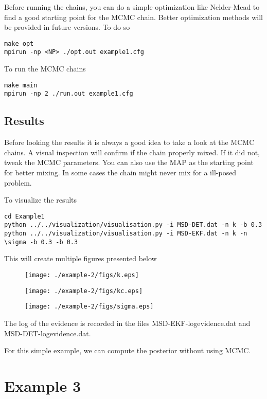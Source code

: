 \documentclass{article}
\begin{document}
Before running the chains, you can do a simple optimization like Nelder-Mead to find a good starting point for the MCMC chain. Better optimization methods will be provided in future versions. To do so
\begin{lstlisting}
make opt
mpirun -np <NP> ./opt.out example1.cfg
\end{lstlisting}

To run the MCMC chains
\begin{lstlisting}
make main
mpirun -np 2 ./run.out example1.cfg
\end{lstlisting}



\subsection{Results}

Before looking the results it is always a good idea to take a look at the MCMC chains. A visual inspection will confirm if the chain properly mixed. If it did not, tweak the MCMC parameters. You can also use the MAP as the starting point for better mixing. In some cases the chain might never mix for a ill-posed problem.

To visualize the results 
\begin{lstlisting}
cd Example1
python ../../visualization/visualisation.py -i MSD-DET.dat -n k -b 0.3
python ../../visualization/visualisation.py -i MSD-EKF.dat -n k -n \sigma -b 0.3 -b 0.3
\end{lstlisting}
This will create multiple figures presented below

\begin{figure}
\texttt{[image: ./example-2/figs/k.eps]}
\end{figure}

\begin{figure}
\texttt{[image: ./example-2/figs/kc.eps]}
\end{figure}

\begin{figure}
\texttt{[image: ./example-2/figs/sigma.eps]}
\end{figure}


The log of the evidence is recorded in the files MSD-EKF-logevidence.dat and MSD-DET-logevidence.dat.


For this simple example, we can compute the posterior without using MCMC.

\section{Example 3}
\end{document}
